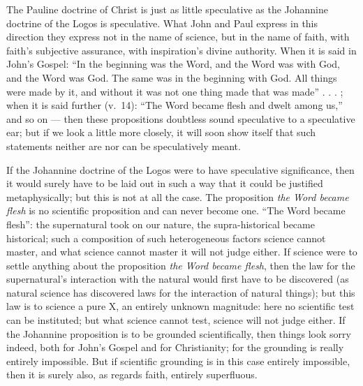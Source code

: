 \documentclass[12pt,a4paper]{book}
\begin{document}
The Pauline doctrine of Christ is just as little speculative as the Johannine doctrine of the
Logos is speculative. What John and Paul express in this direction they express not in the
name of science, but in the name of faith, with faith's subjective assurance, with
inspiration's divine authority. When it is said in John's Gospel: ``In the beginning was the
Word, and the Word was with God, and the Word was God. The same was in the beginning with God.
All things were made by it, and without it was not one thing made that was made'' . . . ; when
it is said further (v.\ 14): ``The Word became flesh and dwelt among us,'' and so on --- then
these propositions doubtless sound speculative to a speculative ear; but if we look a little
more closely, it will soon show itself that such statements neither are nor can be speculatively
meant.

If the Johannine doctrine of the Logos were to have speculative significance, then it would
surely have to be laid out in such a way that it could be justified metaphysically; but
this is not at all the case. The proposition \emph{the Word became flesh} is no scientific
proposition and can never become one. ``The Word became flesh'': the supernatural took on our
nature, the supra-historical became historical; such a composition of such heterogeneous
factors
science cannot master, and what science cannot master it will not judge either. If science were
to settle anything about the proposition \emph{the Word became flesh}, then the law for the
supernatural's interaction with the natural would first have to be discovered (as natural
science has discovered laws for the interaction of natural things); but this law is to science
a pure X, an entirely unknown magnitude:
here no scientific test can be instituted; but what science cannot test, science will not judge
either. If the Johannine proposition is to be grounded scientifically, then things look
sorry indeed, both for John's Gospel and for Christianity; for the grounding is really
entirely impossible. But if scientific grounding is in this case entirely impossible, then it
is surely also, as regards faith, entirely superfluous.
\end{document}
